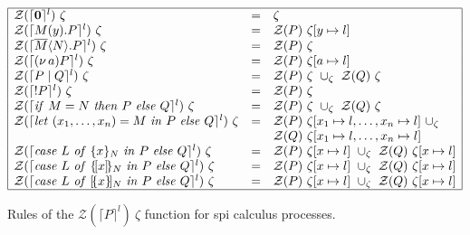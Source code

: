 \documentclass[10pt,a4paper,final,oneside,fleqn]{book}
\begin{document}
\begin{figure}[bht]
\begin{small}
\begin{center}
$\begin{array}{|lll|}
\hline
\mathcal{Z}(\lceil {\bf 0}\rceil^l)~\zeta&=&\zeta\\
\mathcal{Z}(\lceil M(y).P\rceil^l)~\zeta&=&\mathcal{Z}(P)~\zeta[y\mapsto l]\\
\mathcal{Z}(\lceil \overline{M}\langle N\rangle.P\rceil^l)~\zeta&=&\mathcal{Z}(P)~\zeta\\
\mathcal{Z}(\lceil (\nu~\!a)P\rceil^l)~\zeta&=&\mathcal{Z}(P)~\zeta[a\mapsto l]\\
\mathcal{Z}(\lceil P\mid Q\rceil^l)~\zeta&=&\mathcal{Z}(P)~\zeta~\cup_\zeta~\mathcal{Z}(Q)~\zeta\\

\mathcal{Z}(\lceil !P\rceil^l)~\zeta&=&\mathcal{Z}(P)~\zeta\\
\mathcal{Z}(\lceil \mbox{{\itshape if\/} }M=N\mbox{ {\itshape then\/} }P\mbox{ {\itshape else\/} }Q\rceil^l)~\zeta&=&\mathcal{Z}(P)~\zeta~\cup_\zeta~\mathcal{Z}(Q)~\zeta\\
\mathcal{Z}(\lceil \mbox{{\itshape let\/} }(x_1,\ldots,x_n)=M\mbox{ {\itshape in\/} }P\mbox{ {\itshape else\/} }Q\rceil^l)~\zeta&=&\mathcal{Z}(P)~\zeta[x_1\mapsto l,\ldots,x_n\mapsto l]~\cup_\zeta\\
&&\mathcal{Z}(Q)~\zeta[x_1\mapsto l,\ldots,x_n\mapsto l]\\
\mathcal{Z}(\lceil \mbox{{\itshape case\/} }L\mbox{ {\itshape of\/} }\{x\}_N\mbox{ {\itshape in\/} }P\mbox{ {\itshape else\/} }Q\rceil^l)~\zeta&=&\mathcal{Z}(P)~\zeta[x\mapsto l]~\cup_\zeta~\mathcal{Z}(Q)~\zeta[x\mapsto l]\\
\mathcal{Z}(\lceil \mbox{{\itshape case\/} }L\mbox{ {\itshape of\/} }\{\![x]\!\}_N\mbox{ {\itshape in\/} }P\mbox{ {\itshape else\/} }Q\rceil^l)~\zeta&=&\mathcal{Z}(P)~\zeta[x\mapsto l]~\cup_\zeta~\mathcal{Z}(Q)~\zeta[x\mapsto l]\\
\mathcal{Z}(\lceil \mbox{{\itshape case\/} }L\mbox{ {\itshape of\/} }[\!\{x\}\!]_N\mbox{ {\itshape in\/} }P\mbox{ {\itshape else\/} }Q\rceil^l)~\zeta&=&\mathcal{Z}(P)~\zeta[x\mapsto l]~\cup_\zeta~\mathcal{Z}(Q)~\zeta[x\mapsto l]\\
\hline
\end{array}$
\end{center}
\end{small}
\caption{Rules of the $\mathcal{Z}(\lceil P\rceil^l)~\zeta$ function for spi calculus processes.\label{zeta2}}
\end{figure}
\end{document}
